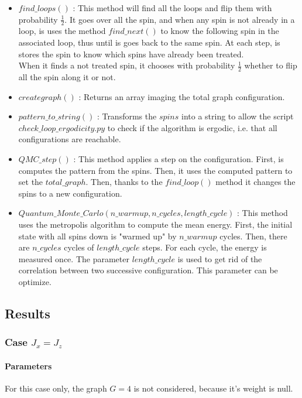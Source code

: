 \documentclass[a4paper,12pt]{article}
\begin{document}
\begin{itemize}[label=$\star$]
\begin{figure}[H]
		\end{figure}
		\item $find\_loops()$ : This method will find all the loops and flip them with probability $\frac{1}{2}$. It goes over all the spin, and when any spin is not already in a loop, is uses the method $find\_next()$ to know the following spin in the associated loop, thus until is goes back to the same spin. At each step, is stores the spin to know which spins have already been treated. \\
		When it finds a not treated spin, it chooses with probability $\frac{1}{2}$ whether to flip all the spin along it or not. 
		\item $creategraph()$ : Returns an array imaging the total graph configuration.
		\item $pattern\_to\_string()$ : Transforms the $spins$ into a string to allow the script $check\_loop\_ergodicity.py$ to check if the algorithm is ergodic, i.e. that all configurations are reachable.
		\item $QMC\_step()$ : This method applies a step on the configuration. First, is computes the pattern from the spins. Then, it uses the computed pattern to set the $total\_graph$. Then, thanks to the $find\_loop()$ method it changes the spins to a new configuration.
		\item $Quantum\_Monte\_Carlo(n\_warmup, n\_cycles, length\_cycle)$ : This method uses the metropolis algorithm to compute the mean energy. First, the initial state with all spins down is "warmed up" by $n\_warmup$ cycles. Then, there are $n\_cycles$ cycles of $length\_cycle$ steps. For each cycle, the energy is measured once. The parameter $length\_cycle$ is used to get rid of the correlation between two successive configuration. This parameter can be optimize. 
	\end{itemize}
	
	\subsection{Results}
	
	\subsubsection{Case $J_{x} = J_{z}$}
	
	\paragraph{Parameters} For this case only, the graph $G = 4$ is not considered, because it's weight is null. 
	
\end{document}
